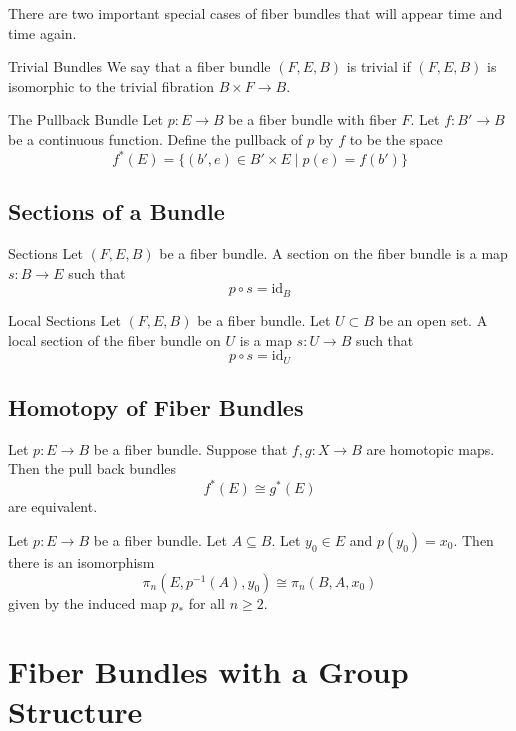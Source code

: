 \documentclass[a4paper]{article}
\begin{document}
There are two important special cases of fiber bundles that will appear time and time again. 

\begin{defn}{Trivial Bundles}{} We say that a fiber bundle $(F,E,B)$ is trivial if $(F,E,B)$ is isomorphic to the trivial fibration $B\times F\to B$. 
\end{defn}

\begin{defn}{The Pullback Bundle}{} Let $p:E\to B$ be a fiber bundle with fiber $F$. Let $f:B'\to B$ be a continuous function. Define the pullback of $p$ by $f$ to be the space $$f^\ast(E)=\{(b',e)\in B'\times E\;|\;p(e)=f(b')\}$$
\end{defn}

\subsection{Sections of a Bundle}
\begin{defn}{Sections}{} Let $(F,E,B)$ be a fiber bundle. A section on the fiber bundle is a map $s:B\to E$ such that $$p\circ s=\text{id}_B$$
\end{defn}

\begin{defn}{Local Sections}{} Let $(F,E,B)$ be a fiber bundle. Let $U\subset B$ be an open set. A local section of the fiber bundle on $U$ is a map $s:U\to B$ such that $$p\circ s=\text{id}_U$$
\end{defn}

\subsection{Homotopy of Fiber Bundles}
\begin{thm}{}{} Let $p:E\to B$ be a fiber bundle. Suppose that $f,g:X\to B$ are homotopic maps. Then the pull back bundles $$f^\ast(E)\cong g^\ast(E)$$ are equivalent. 
\end{thm}

\begin{thm}{}{} Let $p:E\to B$ be a fiber bundle. Let $A\subseteq B$. Let $y_0\in E$ and $p(y_0)=x_0$. Then there is an isomorphism $$\pi_n(E,p^{-1}(A),y_0)\cong\pi_n(B,A,x_0)$$ given by the induced map $p_\ast$ for all $n\geq 2$. 
\end{thm}

\pagebreak
\section{Fiber Bundles with a Group Structure}
\end{document}
